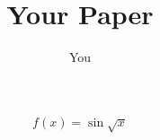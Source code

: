 \documentclass{article}
\title{Your Paper}
\author{You}
\begin{document}
\[f(x)=\sin{\sqrt{x}}\]
\end{document}
